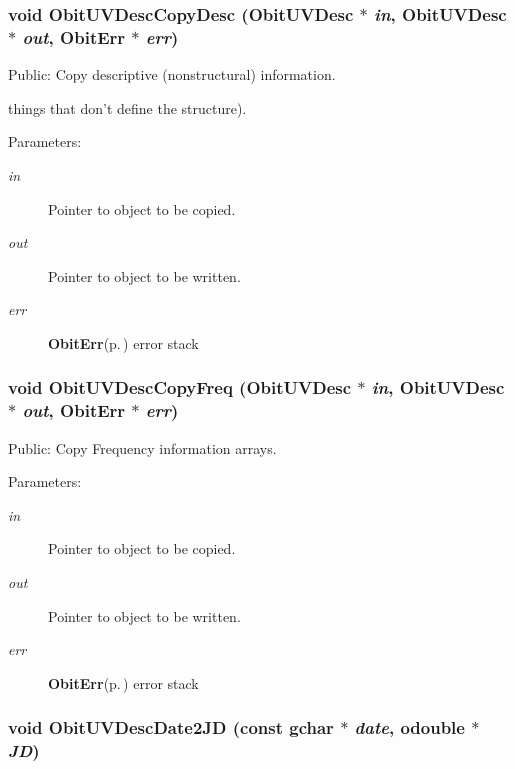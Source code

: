 \subsubsection{\setlength{\rightskip}{0pt plus 5cm}void Obit\-UVDesc\-Copy\-Desc ({\bf Obit\-UVDesc} $\ast$ {\em in}, {\bf Obit\-UVDesc} $\ast$ {\em out}, {\bf Obit\-Err} $\ast$ {\em err})}\label{ObitUVDesc_8c_a12}


Public: Copy descriptive (nonstructural) information. 

things that don't define the structure). \begin{Desc}
\item[Parameters:]
\begin{description}
\item[{\em in}]Pointer to object to be copied. \item[{\em out}]Pointer to object to be written. \item[{\em err}]{\bf Obit\-Err}{\rm (p.\,\pageref{structObitErr})} error stack \end{description}
\end{Desc}
\subsubsection{\setlength{\rightskip}{0pt plus 5cm}void Obit\-UVDesc\-Copy\-Freq ({\bf Obit\-UVDesc} $\ast$ {\em in}, {\bf Obit\-UVDesc} $\ast$ {\em out}, {\bf Obit\-Err} $\ast$ {\em err})}\label{ObitUVDesc_8c_a13}


Public: Copy Frequency information arrays. 

\begin{Desc}
\item[Parameters:]
\begin{description}
\item[{\em in}]Pointer to object to be copied. \item[{\em out}]Pointer to object to be written. \item[{\em err}]{\bf Obit\-Err}{\rm (p.\,\pageref{structObitErr})} error stack \end{description}
\end{Desc}
\subsubsection{\setlength{\rightskip}{0pt plus 5cm}void Obit\-UVDesc\-Date2JD (const gchar $\ast$ {\em date}, {\bf odouble} $\ast$ {\em JD})}\label{ObitUVDesc_8c_a17}


